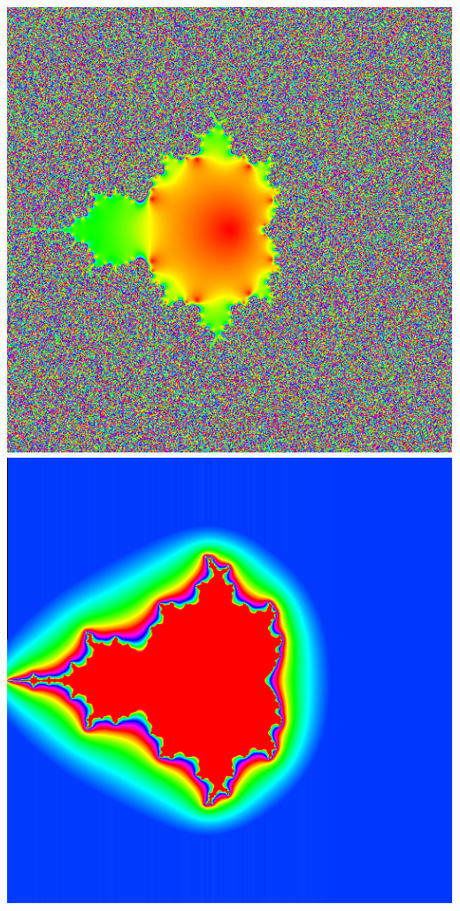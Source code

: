 \documentclass[../r.tex]{subfiles}
\begin{document}
\noindent
\includegraphics[scale=0.15]{../TAing/mandel/9.png}
\includegraphics[scale=0.15]{../TAing/mandel/10.png}
\end{document}
